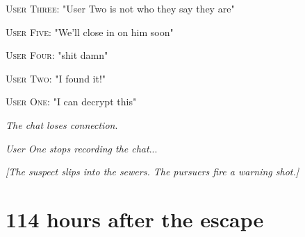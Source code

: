 \documentclass{report}
\begin{document}
\textsc{User Three}: "User Two is not who they say they are" 

\textsc{User Five}: "We'll close in on him soon" 

\textsc{User Four}: "shit damn" 

\textsc{User Two}: "I found it!" 

\textsc{User One}: "I can decrypt this" 

\textit{The chat loses connection}. 

\textit{User One stops recording the chat}...

\textit{[The suspect slips into the sewers. The pursuers fire a warning shot.]}


\section*{114 \small{hours after the escape}}
\end{document}
